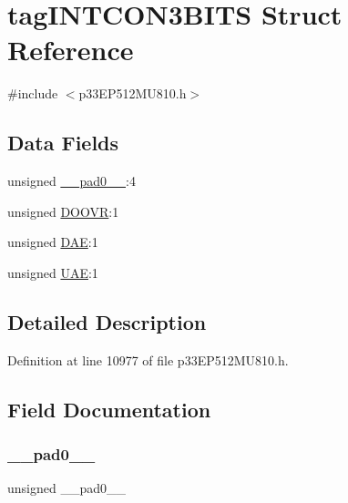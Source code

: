 \hypertarget{structtag_i_n_t_c_o_n3_b_i_t_s}{}\section{tag\+I\+N\+T\+C\+O\+N3\+B\+I\+TS Struct Reference}
\label{structtag_i_n_t_c_o_n3_b_i_t_s}


{\ttfamily \#include $<$p33\+E\+P512\+M\+U810.\+h$>$}

\subsection*{Data Fields}
\begin{DoxyCompactItemize}
\item 
unsigned \hyperlink{structtag_i_n_t_c_o_n3_b_i_t_s_adf71f3d8410c1f1dbbc96680a92c49af}{\+\_\+\+\_\+pad0\+\_\+\+\_\+}\+:4
\item 
unsigned \hyperlink{structtag_i_n_t_c_o_n3_b_i_t_s_ac08ea92557a6100bdfa6e0c8e1842273}{D\+O\+O\+VR}\+:1
\item 
unsigned \hyperlink{structtag_i_n_t_c_o_n3_b_i_t_s_aec1162551ca60d4d19c47e42894a1c1b}{D\+AE}\+:1
\item 
unsigned \hyperlink{structtag_i_n_t_c_o_n3_b_i_t_s_ae86e8a6ab379e697e772868ed37d6443}{U\+AE}\+:1
\end{DoxyCompactItemize}


\subsection{Detailed Description}


Definition at line 10977 of file p33\+E\+P512\+M\+U810.\+h.



\subsection{Field Documentation}
\mbox{\label{structtag_i_n_t_c_o_n3_b_i_t_s_adf71f3d8410c1f1dbbc96680a92c49af}} 
\subsubsection{\texorpdfstring{\+\_\+\+\_\+pad0\+\_\+\+\_\+}{\_\_pad0\_\_}}
{\footnotesize\ttfamily unsigned \+\_\+\+\_\+pad0\+\_\+\+\_\+}



